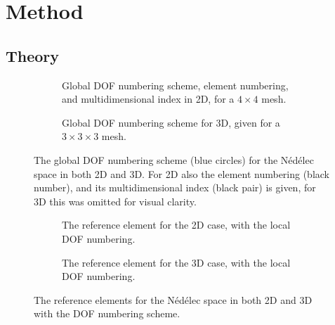 \chapter{Method}
\label{sec:method}
\section{Theory}
\label{subsec:theory}

\begin{figure}[!ht]
    \centering
    \begin{subfigure}[b]{0.4\textwidth}
        \centering
        
        \caption{Global DOF numbering scheme, element numbering, and multidimensional index in 2D, for a \(4 \times 4\) mesh.}
    \end{subfigure}
    \hspace{0.08\textwidth}
    \begin{subfigure}[b]{0.4\textwidth}
        \centering
        
        \caption{Global DOF numbering scheme for 3D, given for a \(3 \times 3 \times 3\) mesh.}
    \end{subfigure}
    \caption{The global DOF numbering scheme (blue circles) for the Nédélec space in both 2D and 3D. For 2D also the element numbering (black number), and its multidimensional index (black pair) is given, for 3D this was omitted for visual clarity.}
    \label{fig:glob_numbering}
\end{figure}

\begin{figure}[!ht]
    \centering
    \begin{subfigure}[b]{0.4\textwidth}
        \centering
        
        \caption{The reference element for the 2D case, with the local DOF numbering.}
    \end{subfigure}
    \hspace{0.08\textwidth}
    \begin{subfigure}[b]{0.4\textwidth}
        \centering
        
        \caption{The reference element for the 3D case, with the local DOF numbering.}
    \end{subfigure}
    \caption{The reference elements for the Nédélec space in both 2D and 3D with the DOF numbering scheme.}
    \label{fig:ref_elements}
\end{figure}

